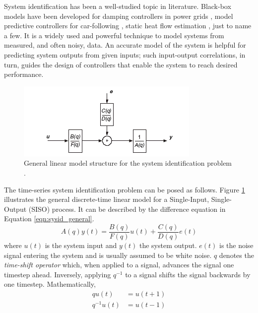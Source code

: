 System identification has been a well-studied topic in literature. Black-box models have been developed for damping controllers in power grids \cite{smartgrid}, model predictive controllers for car-following \cite{car_following}, static heat flow estimation \cite{static_heat_flow}, just to name a few. It is a widely used and powerful technique to model systems from measured, and often noisy, data. An accurate model of the system is helpful for predicting system outputs from given inputs; such input-output correlations, in turn, guides the design of controllers that enable the system to reach desired performance.

\begin{figure}[b!]
    \centering
    \includegraphics{figures/sys_general.png}
    \caption{General linear model structure for the system identification problem \cite{ni}.}
    \label{fig:sys_general}
\end{figure}

The time-series system identification problem can be posed as follows. Figure \ref{fig:sys_general} illustrates the general discrete-time linear model for a Single-Input, Single-Output (SISO) process. It can be described by the difference equation in Equation \ref{eqn:sysid_general}. 
\begin{equation}
    \label{eqn:sysid_general}
    A(q) y(t) = \frac{B(q)}{F(q)} u(t) + \frac{C(q)}{D(q)} e(t)
\end{equation}
where $u(t)$ is the system input and $y(t)$ the system output. $e(t)$ is the noise signal entering the system and is usually assumed to be white noise. $q$ denotes the \emph{time-shift operator} which, when applied to a signal, advances the signal one timestep ahead. Inversely, applying $q^{-1}$ to a signal shifts the signal backwards by one timestep. Mathematically, 
\begin{equation}
    \label{eqn:def_q}
    \begin{split}
        qu(t) & = u(t+1) \\
        q^{-1}u(t) & = u(t-1)
    \end{split}
\end{equation}

